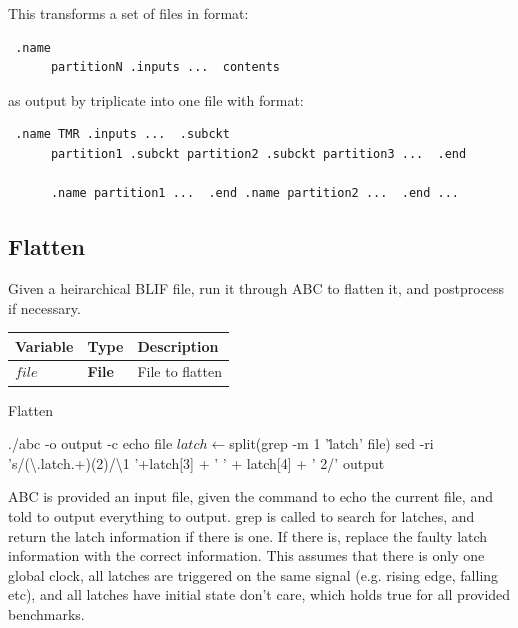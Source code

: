 \documentclass[12pt,final,oneside]{dwThesis} %
\begin{document}
   This transforms a set of files in format: \begin{lstlisting} .name
      partitionN .inputs ...  contents \end{lstlisting} as output by triplicate
   into one file with format: \begin{lstlisting} .name TMR .inputs ...  .subckt
      partition1 .subckt partition2 .subckt partition3 ...  .end

      .name partition1 ...  .end .name partition2 ...  .end ...
   \end{lstlisting} \newpage \subsection{Flatten}\label{algFlatten} Given a
   heirarchical \gls{BLIF} file, run it through
   \gls{ABC}\cite{abc} to flatten it, and postprocess if
   necessary.  \begin{algorithm} \begin{center}
         \begin{tabularx}{\linewidth}{llX} \toprule Variable & Type &
            Description\\ \midrule $file$ &\textbf{  File } &  File to
            flatten\\ \bottomrule \end{tabularx} \end{center}
      \caption{Flatten}\label{Flatten} \begin{algorithmic}[1]
           \State ./abc -o output -c
         echo file  \State $latch \gets $split(grep -m 1 '\.latch' file)
          \State sed -ri
         's/(\textbackslash.latch.+)(2)/\textbackslash1 '+latch[3] + ' ' +
         latch[4] + ' 2/' output \EndIf \EndProcedure \end{algorithmic}
   \end{algorithm}

   \gls{ABC} is provided an input file, given the command to echo the current
   file, and told to output everything to output.  grep is called to search for
   latches, and return the latch information if there is one. If there is,
   replace the faulty latch information with the correct information.  This
   assumes that there is only one global clock, all latches are triggered on
   the same signal (e.g. rising edge, falling etc), and all latches have
   initial state don't care, which holds true for all provided benchmarks.
\end{document}
